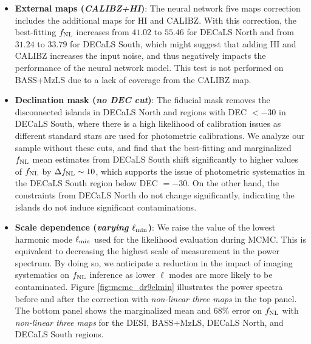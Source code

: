 \begin{itemize}[itemindent=*]
\item \textbf{External maps (\textit{CALIBZ+HI})}: The neural network five maps correction includes the additional maps for HI and CALIBZ. With this correction, the best-fitting $f_{\rm NL}$ increases from $41.02$ to $55.46$ for DECaLS North and from $31.24$ to $33.79$ for DECaLS South, which might suggest that adding HI and CALIBZ increases the input noise, and thus negatively impacts the performance of the neural network model. This test is not performed on BASS+MzLS due to a lack of coverage from the CALIBZ map. 

\item \textbf{Declination mask (\textit{no DEC cut})}: The fiducial mask removes the disconnected islands in DECaLS North and regions with DEC $<-30$ in DECaLS South, where there is a high likelihood of calibration issues as different standard stars are used for photometric calibrations. We analyze our sample without these cuts, and find that the best-fitting and marginalized $f_{\rm NL}$ mean estimates from DECaLS South shift significantly to higher values of $f_{\rm NL}$ by $\Delta f_{\rm NL} \sim 10$, which supports the issue of photometric systematics in the DECaLS South region below DEC $=-30$. On the other hand, the constraints from DECaLS North do not change significantly, indicating the islands do not induce significant contaminations. 

\item \textbf{Scale dependence (\textit{varying $\ell_{\rm min}$})}: We raise the value of the lowest harmonic mode $\ell_{\rm min}$ used for the likelihood evaluation during MCMC. This is equivalent to decreasing the highest scale of measurement in the power spectrum. By doing so, we anticipate a reduction in the impact of imaging systematics on $f_{\rm NL}$ inference as lower $\ell$ modes are more likely to be contaminated. Figure \ref{fig:mcmc_dr9elmin} illustrates the power spectra before and after the correction with \textit{non-linear three maps} in the top panel. The bottom panel shows the marginalized mean and $68\%$ error on $f_{\rm NL}$ with \textit{non-linear three maps} for the DESI, BASS+MzLS, DECaLS North, and DECaLS South regions.  

\end{itemize}

